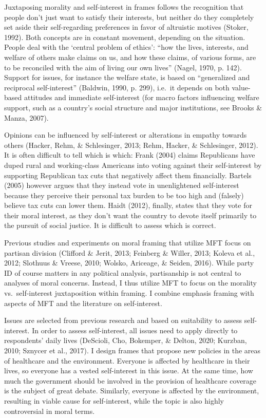\documentclass[12pt,econ]{sources/authesis}
\begin{document}
Juxtaposing morality and self-interest in frames follows the recognition that people don't just want to satisfy their interests, but neither do they completely set aside their self-regarding preferences in favor of altruistic motives (Stoker, 1992). Both concepts are in constant movement, depending on the situation. People deal with the `central problem of ethics': ``how the lives, interests, and welfare of others make claims on us, and how these claims, of various forms, are to be reconciled with the aim of living our own lives'' (Nagel, 1970, p. 142). Support for issues, for instance the welfare state, is based on ``generalized and reciprocal self-interest'' (Baldwin, 1990, p. 299), i.e.~it depends on both value-based attitudes and immediate self-interest (for macro factors influencing welfare support, such as a country's social structure and major institutions, see Brooks \& Manza, 2007).

Opinions can be influenced by self-interest or alterations in empathy towards others (Hacker, Rehm, \& Schlesinger, 2013; Rehm, Hacker, \& Schlesinger, 2012). It is often difficult to tell which is which: Frank (2004) claims Republicans have duped rural and working-class Americans into voting against their self-interest by supporting Republican tax cuts that negatively affect them financially. Bartels (2005) however argues that they instead vote in unenlightened self-interest because they perceive their personal tax burden to be too high and (falsely) believe tax cuts can lower them. Haidt (2012), finally, states that they vote for their moral interest, as they don't want the country to devote itself primarily to the pursuit of social justice. It is difficult to assess which is correct.

Previous studies and experiments on moral framing that utilize MFT focus on partisan division (Clifford \& Jerit, 2013; Feinberg \& Willer, 2013; Koleva et al., 2012; Slothuus \& Vreese, 2010; Wolsko, Ariceage, \& Seiden, 2016). While party ID of course matters in any political analysis, partisanship is not central to analyses of moral concerns. Instead, I thus utilize MFT to focus on the morality vs.~self-interest juxtaposition within framing. I combine emphasis framing with aspects of MFT and the literature on self-interest.

Issues are selected from previous research and based on suitability to assess self-interest. In order to assess self-interest, all issues need to apply directly to respondents' daily lives (DeScioli, Cho, Bokemper, \& Delton, 2020; Kurzban, 2010; Sznycer et al., 2017). I design frames that propose new policies in the areas of healthcare and the environment. Everyone is affected by healthcare in their lives, so everyone has a vested self-interest in this issue. At the same time, how much the government should be involved in the provision of healthcare coverage is the subject of great debate. Similarly, everyone is affected by the environment, resulting in viable cause for self-interest, while the topic is also highly controversial in moral terms.
\end{document}
